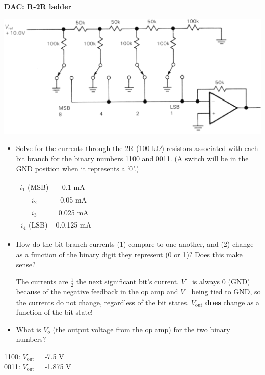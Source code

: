 \item {\bf DAC: R-2R ladder} 

\begin{center}
\includegraphics[width=0.75\linewidth]{DAC_R-2R/R-2R_DAC.eps}
\end{center}

\begin{itemize}
\item Solve for the currents through the 2R (100 k$\Omega$) resistors
associated with each bit branch for the binary numbers 1100 and 0011.  (A
switch will be in the GND position when it represents a `0'.)

\begin{center}
\begin{tabular}{|c|c|}\hline
$i_1$ (MSB) & 0.1 mA \\
$i_2$ & 0.05 mA \\
$i_3$ & 0.025 mA \\
$i_4$ (LSB) & 0.0.125 mA \\ \hline
\end{tabular}
\end{center}

\item How do the bit branch currents (1) compare to one another, and (2) change
as a function of the binary digit they represent (0 or 1)?  Does this make
sense?

The currents are $\frac{1}{2}$ the next significant bit's current.  $V_-$ is
always 0 (GND) because of the negative feedback in the op amp and $V_+$ being
tied to GND, so the currents do not change, regardless of the bit states.
$V_{\textrm{out}}$ {\bf does} change as a function of the bit state!

\item What is $V_o$ (the output voltage from the op amp) for the two binary numbers?
\end{itemize}

\begin{center}
1100: $V_{\textrm{out}}$ = -7.5 V \\
0011: $V_{\textrm{out}}$ = -1.875 V
\end{center}

